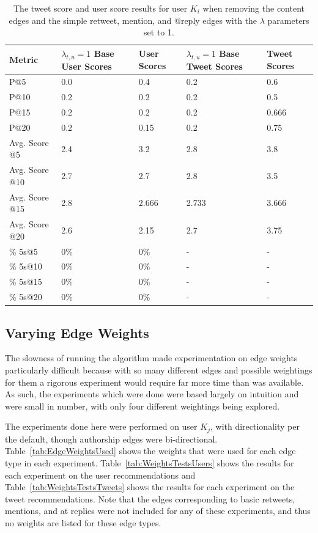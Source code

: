 \begin{table}
\centering
\begin{tabular}{l|p{2cm}|p{2cm}|p{2cm}|p{2cm}}
{\bf Metric} & {\bf $\lambda_{t,u}=1$ Base User Scores} & {\bf User Scores} & {\bf $\lambda_{t,u}=1$ Base Tweet Scores} & {\bf Tweet Scores} \\ \hline
P@5   & 0.0 & 0.4 & 0.2 & 0.6 \\ \hline
P@10 & 0.2 & 0.2 & 0.2 & 0.5 \\ \hline
P@15 & 0.2 & 0.2 & 0.2 & 0.666 \\ \hline
P@20 & 0.2 & 0.15 & 0.2 & 0.75 \\ \hline

Avg. Score @5   & 2.4 & 3.2 & 2.8 & 3.8 \\ \hline
Avg. Score @10 & 2.7 & 2.7 & 2.8 & 3.5 \\ \hline
Avg. Score @15 & 2.8 & 2.666 & 2.733 & 3.666 \\ \hline
Avg. Score @20 & 2.6 & 2.15 & 2.7 & 3.75 \\ \hline

\% 5s@5    & 0\% & 0\% & - & - \\ \hline
\% 5s@10  & 0\% & 0\% & - & - \\ \hline
\% 5s@15  & 0\% & 0\% & - & - \\ \hline
\% 5s@20  & 0\% & 0\% & - & - \\

\end{tabular}
\caption{The tweet score and user score results for user $K_{i}$ when removing the content edges and the simple retweet, mention, and @reply edges with the $\lambda$ parameters set to 1.}
\label{tab:RemoveContentAnd369LambdasAt1}
\end{table}


\subsection{Varying Edge Weights}

The slowness of running the algorithm made experimentation on edge weights particularly difficult because with so many different edges and possible weightings for them a rigorous experiment would require far more time than was available. As such, the experiments which were done were based largely on intuition and were small in number, with only four different weightings being explored.

The experiments done here were performed on user $K_{j}$, with directionality per the default, though authorship edges were bi-directional. Table~\ref{tab:EdgeWeightsUsed} shows the weights that were used for each edge type in each experiment. Table~\ref{tab:WeightsTestsUsers} shows the results for each experiment on the user recommendations and Table~\ref{tab:WeightsTestsTweets} shows the results for each experiment on the tweet recommendations. Note that the edges corresponding to basic retweets, mentions, and at replies were not included for any of these experiments, and thus no weights are listed for these edge types.

